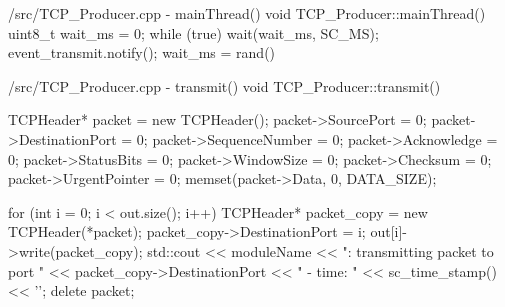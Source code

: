\documentclass[../main.tex]{subfiles}
\begin{document}
\begin{myminted}{/src/TCP\_Producer.cpp - mainThread()}
void TCP_Producer::mainThread() {
    uint8_t wait_ms = 0;
    while (true) {
        wait(wait_ms, SC_MS); 
        event_transmit.notify();
        wait_ms = rand() %
    }
}
\end{myminted}

\begin{myminted}{/src/TCP\_Producer.cpp - transmit()}
void TCP_Producer::transmit() {
    TCPHeader* packet = new TCPHeader();
    packet->SourcePort         = 0;
    packet->DestinationPort    = 0;
    packet->SequenceNumber     = 0;    
    packet->Acknowledge        = 0;
    packet->StatusBits         = 0;
    packet->WindowSize         = 0;
    packet->Checksum           = 0;
    packet->UrgentPointer      = 0;
    memset(packet->Data, 0, DATA_SIZE);

    for (int i = 0; i < out.size(); i++) {
        TCPHeader* packet_copy = new TCPHeader(*packet);
        packet_copy->DestinationPort = i;
        out[i]->write(packet_copy);
        std::cout << moduleName << ": transmitting packet to port " << packet_copy->DestinationPort
                  << " - time: " << sc_time_stamp() << '\n';
    }
    delete packet;
}
\end{myminted}
\end{document}
